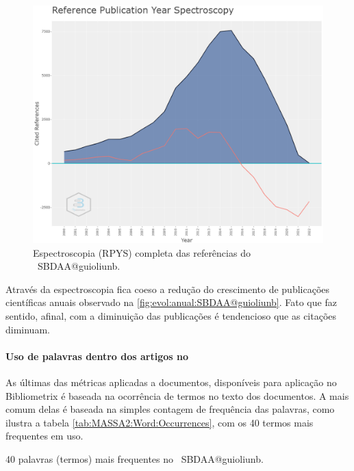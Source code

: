 \begin{figure}
    \centering
    \includegraphics[width=1\textwidth]{experiments/guioliunb/AnaliseBibliometrica/SocialBigDataAnalysis/reference spectroscopy.png}
    \caption{Espectroscopia (RPYS) completa das referências do \dataset\ SBDAA@guioliunb.}
    \label{fig:MASSA2-ReferenceSpectroscopy}
\end{figure}

Através da espectroscopia fica coeso a redução do crescimento de publicações científicas anuais observado na \ref{fig:evol:anual:SBDAA@guioliunb}. Fato que faz sentido, afinal, com a diminuição das publicações é tendencioso que as citações diminuam.


\paragraph{Uso de palavras dentro dos artigos no \dataset}

As últimas das métricas aplicadas a documentos, disponíveis para aplicação no Bibliometrix é baseada na ocorrência de termos no texto dos documentos. A mais comum delas é baseada na simples contagem de frequência das palavras, como ilustra a tabela \ref{tab:MASSA2:Word:Occurrences}, com os 40 termos mais frequentes em uso.

\begin{table}[htp]
    \centering
\footnotesize
{}

    \caption{40 palavras (termos) mais frequentes no \dataset\ SBDAA@guioliunb.}
    \label{tab:MASSA2:Word:Occurrences}
\end{table}

